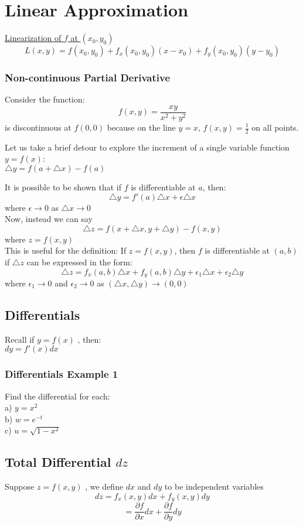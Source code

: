 \documentclass[12pt]{article}
\begin{document}
\section{Linear Approximation}
\underline{Linearization of \(f\) at \((x_0,y_0)\) }
\[
	L(x,y) = f(x_0,y_0) + f_x(x_0,y_0)(x-x_0) + f_y(x_0,y_0)(y-y_0)
\]
\subsubsection{Non-continuous Partial Derivative}
Consider the function:
\[
	f(x,y) = \frac{xy}{x^2+y^2}
\]
is discontinuous at \(f(0,0)\) because on the line \(y=x\), \(f(x,y) = \frac{1}{2}\) on all points.

Let us take a brief detour to explore the increment of a single variable function \(y=f(x)\):\\
\(\triangle y = f(a+ \triangle x)-f(a)\)

It is possible to be shown that if \(f\) is differentiable at \(a\), then: 
\[
	\triangle y = f'(a)\triangle x + \epsilon \triangle x
\]
where \(\epsilon \rightarrow 0\) as \(\triangle x \rightarrow 0\)\\
Now, instead we can say \[
	\triangle z = f(x+\triangle x, y + \triangle y) - f(x,y)
\]
where \(z=f(x,y)\)\\
This is useful for the definition:
If \(z=f(x,y)\), then \(f\) is differentiable at \((a,b)\) if \(\triangle z\) can be expressed in the form: 
\[
	\triangle z= f_x(a,b)\triangle x + f_y(a,b)\triangle y + \epsilon_1 \triangle x + \epsilon_2\triangle y
\]
where \(\epsilon_1 \rightarrow 0\) and \(\epsilon_2 \rightarrow 0\) as \((\triangle x, \triangle y) \rightarrow (0,0)\)

\subsection{Differentials}
Recall if \(y=f(x)\) , then: \\
\(dy=f'(x)dx\) 

\subsubsection{Differentials Example 1}
Find the differential for each:\\
a) \(y=x^2\) \\
b) \(w=e^{-t}\) \\
c) \(u=\sqrt{1-x^2}\) 

\subsection{Total Differential \(dz\) }
Suppose \(z=f(x,y)\) , we define \(dx\) and \(dy\) to be independent variables\
\[
	dz = f_x(x,y)dx + f_y(x,y)dy
\]
\[
	=\frac{\partial f}{\partial x} dx + \frac{\partial f}{\partial y} dy
\]
\end{document}
